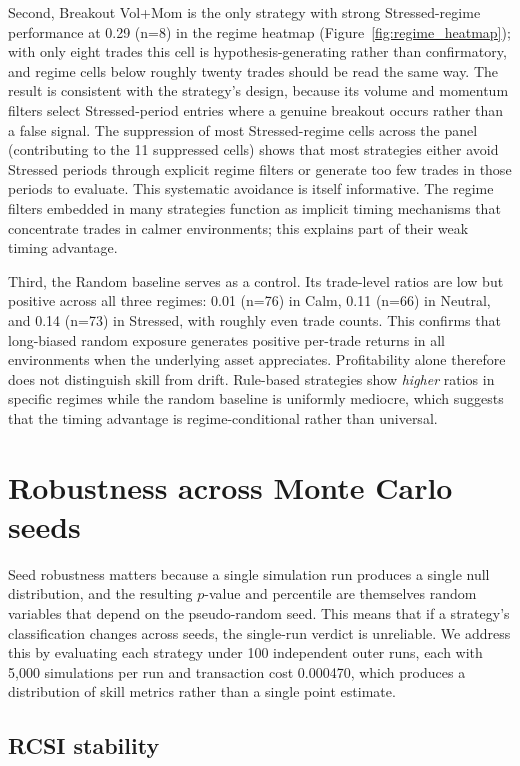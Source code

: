 \documentclass[preprint,12pt]{elsarticle}
\theoremstyle{definition}
\begin{document}
Second, Breakout Vol+Mom is the only strategy with strong Stressed-regime performance at 0.29 (n=8) in the regime heatmap (Figure~\ref{fig:regime_heatmap}); with only eight trades this cell is hypothesis-generating rather than confirmatory, and regime cells below roughly twenty trades should be read the same way. The result is consistent with the strategy's design, because its volume and momentum filters select Stressed-period entries where a genuine breakout occurs rather than a false signal. The suppression of most Stressed-regime cells across the panel (contributing to the 11 suppressed cells) shows that most strategies either avoid Stressed periods through explicit regime filters or generate too few trades in those periods to evaluate. This systematic avoidance is itself informative. The regime filters embedded in many strategies function as implicit timing mechanisms that concentrate trades in calmer environments; this explains part of their weak timing advantage.

Third, the Random baseline serves as a control. Its trade-level ratios are low but positive across all three regimes: 0.01 (n=76) in Calm, 0.11 (n=66) in Neutral, and 0.14 (n=73) in Stressed, with roughly even trade counts. This confirms that long-biased random exposure generates positive per-trade returns in all environments when the underlying asset appreciates. Profitability alone therefore does not distinguish skill from drift. Rule-based strategies show \emph{higher} ratios in specific regimes while the random baseline is uniformly mediocre, which suggests that the timing advantage is regime-conditional rather than universal.

\section{Robustness across Monte Carlo seeds}

Seed robustness matters because a single simulation run produces a single null distribution, and the resulting $p$-value and percentile are themselves random variables that depend on the pseudo-random seed. This means that if a strategy's classification changes across seeds, the single-run verdict is unreliable. We address this by evaluating each strategy under 100 independent outer runs, each with 5{,}000 simulations per run and transaction cost 0.000470, which produces a distribution of skill metrics rather than a single point estimate.

\subsection{RCSI stability}
\end{document}
